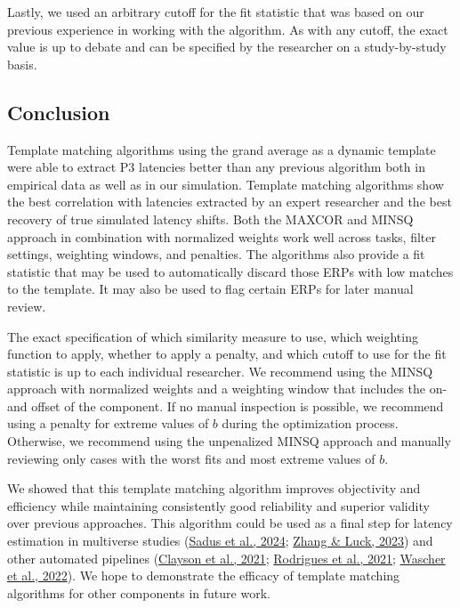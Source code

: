 \documentclass[
  man]{apa7}
\begin{document}
Lastly, we used an arbitrary cutoff for the fit statistic that was based on our previous experience in working with the algorithm. As with any cutoff, the exact value is up to debate and can be specified by the researcher on a study-by-study basis.

\hypertarget{conclusion}{%
\subsection{Conclusion}\label{conclusion}}

Template matching algorithms using the grand average as a dynamic template were able to extract P3 latencies better than any previous algorithm both in empirical data as well as in our simulation. Template matching algorithms show the best correlation with latencies extracted by an expert researcher and the best recovery of true simulated latency shifts. Both the MAXCOR and MINSQ approach in combination with normalized weights work well across tasks, filter settings, weighting windows, and penalties. The algorithms also provide a fit statistic that may be used to automatically discard those ERPs with low matches to the template. It may also be used to flag certain ERPs for later manual review.

The exact specification of which similarity measure to use, which weighting function to apply, whether to apply a penalty, and which cutoff to use for the fit statistic is up to each individual researcher. We recommend using the MINSQ approach with normalized weights and a weighting window that includes the on- and offset of the component. If no manual inspection is possible, we recommend using a penalty for extreme values of \(b\) during the optimization process. Otherwise, we recommend using the unpenalized MINSQ approach and manually reviewing only cases with the worst fits and most extreme values of \(b\).

We showed that this template matching algorithm improves objectivity and efficiency while maintaining consistently good reliability and superior validity over previous approaches. This algorithm could be used as a final step for latency estimation in multiverse studies (\protect\hyperlink{ref-sadus2024explorative}{Sadus et al., 2024}; \protect\hyperlink{ref-zhang2023variations}{Zhang \& Luck, 2023}) and other automated pipelines (\protect\hyperlink{ref-clayson2021data}{Clayson et al., 2021}; \protect\hyperlink{ref-rodrigues2021epos}{Rodrigues et al., 2021}; \protect\hyperlink{ref-wascher2022mental}{Wascher et al., 2022}). We hope to demonstrate the efficacy of template matching algorithms for other components in future work.
\end{document}
